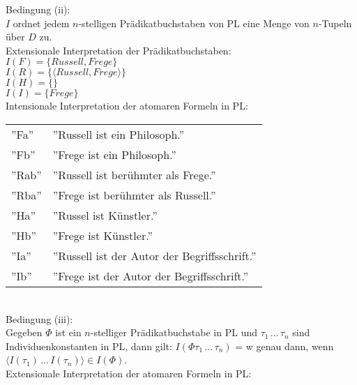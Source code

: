 \documentclass{scrartcl}
\begin{document}
Bedingung (ii): \\
$ I $ ordnet jedem $ n $-stelligen Prädikatbuchstaben von PL eine Menge von $ n $-Tupeln über $ D $ zu. \\

Extensionale Interpretation der Prädikatbuchstaben: \\

$ I(F) = \{ Russell,Frege \} $ \\
$ I(R) = \{ \langle Russell,Frege \rangle \} $ \\
$ I(H) = \{\} $ \\
$ I(I) = \{ Frege \} $ \\

Intensionale Interpretation der atomaren Formeln in PL: \\

\begin{tabularx}{\linewidth}{l l}
	''Fa'' & ''Russell ist ein Philosoph.'' \\
	''Fb'' & ''Frege ist ein Philosoph.'' \\
	''Rab'' & ''Russell ist berühmter als Frege.'' \\
	''Rba'' & ''Frege ist berühmter als Russell.'' \\
	''Ha'' & ''Russel ist Künstler.'' \\
	''Hb'' & ''Frege ist Künstler.'' \\
	''Ia'' & ''Russell ist der Autor der Begriffsschrift.'' \\
	''Ib'' & ''Frege ist der Autor der Begriffsschrift.''
\end{tabularx} \\

Bedingung (iii): \\
Gegeben $ \Phi $ ist ein $ n $-stelliger Prädikatbuchstabe in PL und $ \tau_1 \, \ldots \, \tau_n $ sind Individuenkonstanten in PL, dann gilt: $ I(\Phi \tau_1 \, \ldots \, \tau_n) $ = w genau dann, wenn $ \langle I(\tau_1) \, \ldots \, I(\tau_n) \rangle \in I(\Phi) $. \\

Extensionale Interpretation der atomaren Formeln in PL: \\
\end{document}
